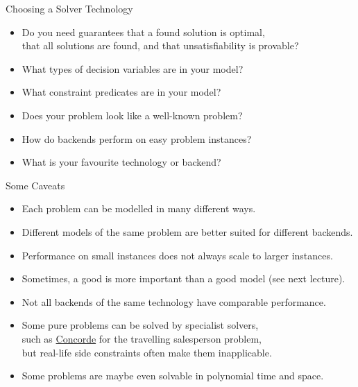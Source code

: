 \documentclass{cons-beamer}
\begin{document}
\begin{frame}{Choosing a Solver Technology}
  \begin{itemize}
    \item Do you need guarantees that a found solution is optimal, \\
      that all solutions are found, and that unsatisfiability is
      provable? \vfill
    \item What types of decision variables are in your model? \vfill
    \item What constraint predicates are in your model? \vfill
    \item Does your problem look like a well-known problem? \vfill
    \item How do backends perform on easy problem instances? \vfill
    \item What is your favourite technology or backend?
  \end{itemize}
\end{frame}

\begin{frame}{Some Caveats}
  \begin{itemize}
    \item Each problem can be modelled in many different ways.
    \item Different models of the same problem are better suited for different
      backends.
    \item Performance on small instances does not always scale to larger
      instances.
    \item Sometimes, a good  is more important
      than a good model (see next lecture).
    \item Not all backends of the same technology have comparable
      performance.
    \item Some pure problems can be solved by specialist solvers, \\
      such as
      \href{https://www.math.uwaterloo.ca/tsp/concorde}{Concorde} for
      the travelling salesperson problem, \\ but real-life side
      constraints often make them inapplicable.
    \item Some problems are maybe even solvable in polynomial time and
      space.
  \end{itemize}
\end{frame}
\end{document}

